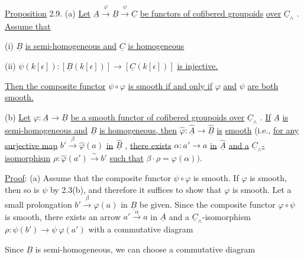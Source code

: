 \underline{Proposition} 2.9.  (a)  \underline{Let}  $\underline{A} \xrightarrow{\ \varphi\ } \underline{B} \xrightarrow{\ \psi\ } \underline{C}$  \underline{be functors of cofibered groupoids} \underline{over}  $\underline{C}_{\wedge}$  . \underline{Assume that}

(i)  $\underline{B}$  \underline{is semi-homogeneous and}  $\underline{C}$  \underline{is homogeneous}

(ii)  $\psi(k[\epsilon]) : [\underline{B}(k[\epsilon])] \longrightarrow [\underline{C}(k[\epsilon])]$  \underline{is injective.}

\underline{Then the composite functor}  $\psi \circ \varphi$  \underline{is smooth if and only if}  $\varphi$  \underline{and}  $\psi$  \underline{are both}
\underline{smooth.}

(b)  \underline{Let} $\varphi : \underline{A} \longrightarrow \underline{B}$ \underline{be a smooth functor of cofibered groupoids over} $\underline{C}_{\wedge}$ . \underline{If} $\underline{A}$ \underline{is semi-homogeneous and} $\underline{B}$ \underline{is homogeneous, then} $\widehat{\varphi} : \widehat{\underline{A}} \to \widehat{\underline{B}}$ \underline{is} \underline{smooth} (i.e., \underline{for any surjective map} $b' \xrightarrow{\ \beta\ } \widehat{\varphi}(a)$ \underline{in} $\widehat{\underline{B}}$ , \underline{there exists} $\alpha : a' \to a$ \underline{in} $\widehat{\underline{A}}$ \underline{and a} $\underline{C}_{\wedge}$\underline{-isomorphism} $\rho : \widehat{\varphi}(a') \xrightarrow{\ \sim\ } b'$ \underline{such that} $\beta \cdot \rho = \varphi(\alpha))$.

\underline{Proof}: (a)  Assume that the composite functor $\psi \circ \varphi$ is smooth. If $\varphi$ is smooth, then so is $\psi$ by 2.3(b), and therefore it suffices to show that $\varphi$ is smooth. Let a small prolongation $b' \xrightarrow{\ \beta\ } \varphi(a)$ in $\underline{B}$ be given. Since the composite functor $\varphi \circ \psi$ is smooth, there exists an arrow $a' \xrightarrow{\ \alpha\ } a$ in $\underline{A}$ and a $\underline{C}_{\wedge}$-isomorphism $\rho : \psi(b') \longrightarrow \psi\ \varphi(a')$ with a commutative diagram

\begin{center}
\end{center}
Since $\underline{B}$ is semi-homogeneous, we can choose a commutative diagram

